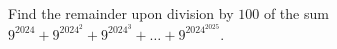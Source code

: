 Find the remainder upon division by $100$ of the sum $9^{2024}+9^{2024^{2}}+9^{2024^{3}}+\ldots+9^{2024^{2025}}$.
